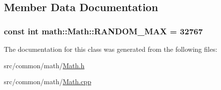 \subsection{Member Data Documentation}
\hypertarget{classmath_1_1Math_a8b8007f82a1fd063ea5ce5dfacbc531e}{
\subsubsection[{R\-A\-N\-D\-O\-M\-\_\-\-M\-A\-X}]{\setlength{\rightskip}{0pt plus 5cm}const int math\-::\-Math\-::\-R\-A\-N\-D\-O\-M\-\_\-\-M\-A\-X = 32767\hspace{0.3cm}{\ttfamily [static]}}}\label{classmath_1_1Math_a8b8007f82a1fd063ea5ce5dfacbc531e}


The documentation for this class was generated from the following files\-:\begin{DoxyCompactItemize}
\item 
src/common/math/\hyperlink{Math_8h}{Math.\-h}\item 
src/common/math/\hyperlink{Math_8cpp}{Math.\-cpp}\end{DoxyCompactItemize}
